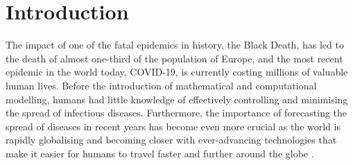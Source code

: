 \documentclass[smallextended]{svjour3}       %
\begin{document}
\section{Introduction}

The impact of one of the fatal epidemics in history, the Black Death, has led to the death of almost one-third of the population of Europe, and the most recent epidemic in the world today, COVID-19, is currently costing millions of valuable human lives. Before the introduction of mathematical and computational modelling, humans had little knowledge of effectively controlling and minimising the spread of infectious diseases. Furthermore, the importance of forecasting the spread of diseases in recent years has become even more crucial as the world is rapidly globalising and becoming closer with ever-advancing technologies that make it easier for humans to travel faster and further around the globe \cite{saker2004globalization}.
\end{document}
